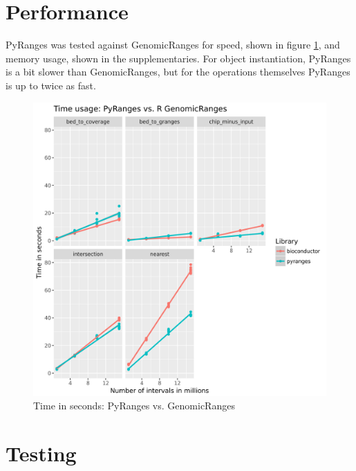 \documentclass[10pt,letterpaper]{article}
\begin{document}
\section*{Performance}

PyRanges was tested against GenomicRanges for speed, shown in figure \ref{fig1},
and memory usage, shown in the supplementaries. For object instantiation,
PyRanges is a bit slower than GenomicRanges, but for the operations themselves
PyRanges is up to twice as fast.

\begin{figure}
\includegraphics[width=1\textwidth]{graphs/time.png}
\caption{Time in seconds: PyRanges vs. GenomicRanges} %
\label{fig1} %
\end{figure} %

\section*{Testing}
\end{document}
